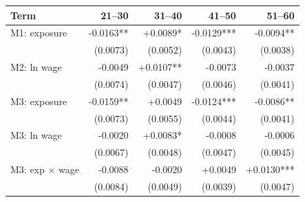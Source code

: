\begin{tabular}{lrrrr}
\toprule
Term & 21–30 & 31–40 & 41–50 & 51–60 \\
\midrule
M1: exposure & -0.0163** & +0.0089* & -0.0129*** & -0.0094** \\
 & (0.0073) & (0.0052) & (0.0043) & (0.0038) \\
M2: ln wage & -0.0049 & +0.0107** & -0.0073 & -0.0037 \\
 & (0.0074) & (0.0047) & (0.0046) & (0.0041) \\
M3: exposure & -0.0159** & +0.0049 & -0.0124*** & -0.0086** \\
 & (0.0073) & (0.0055) & (0.0044) & (0.0041) \\
M3: ln wage & -0.0020 & +0.0083* & -0.0008 & -0.0006 \\
 & (0.0067) & (0.0048) & (0.0047) & (0.0045) \\
M3: exp $\times$ wage & -0.0088 & -0.0020 & +0.0049 & +0.0130*** \\
 & (0.0084) & (0.0049) & (0.0039) & (0.0047) \\
\bottomrule
\end{tabular}